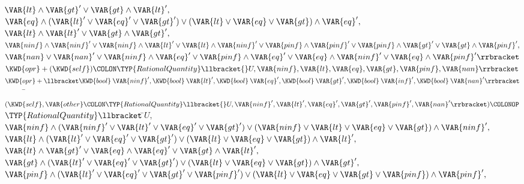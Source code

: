 \begin{Fortress}
\(                         \VAR{lt} \wedge \VAR{gt}' \vee \VAR{gt} \wedge \VAR{lt}',\)\\
\(                         \VAR{eq} \wedge (\VAR{lt}' \vee \VAR{eq}' \vee \VAR{gt}') \vee (\VAR{lt} \vee \VAR{eq} \vee \VAR{gt}) \wedge \VAR{eq}',\)\\
\(                         \VAR{lt} \wedge \VAR{lt}' \vee \VAR{gt} \wedge \VAR{gt}',\)\\
\(                         \VAR{ninf} \wedge \VAR{ninf}' \vee \VAR{ninf} \wedge \VAR{lt}' \vee \VAR{lt} \wedge \VAR{ninf}' \vee \VAR{pinf} \wedge \VAR{pinf}' \vee \VAR{pinf} \wedge \VAR{gt}' \vee \VAR{gt} \wedge \VAR{pinf}',\)\\
\(                         \VAR{nan} \vee \VAR{nan}' \vee \VAR{ninf} \wedge \VAR{eq}' \vee \VAR{pinf} \wedge \VAR{eq}' \vee \VAR{eq} \wedge \VAR{ninf}' \vee \VAR{eq} \wedge \VAR{pinf}'\rrbracket\)\-\-\\\poptabs\poptabs
\(  \KWD{opr} +(\KWD{self})\COLON \TYP{RationalQuantity}\llbracket{}U,\VAR{ninf},\VAR{lt},\VAR{eq},\VAR{gt},\VAR{pinf},\VAR{nan}\rrbracket\)\\
\(  \KWD{opr} +\llbracket\KWD{bool}\:\VAR{ninf}', \KWD{bool}\:\VAR{lt}', \KWD{bool}\:\VAR{eq}', \KWD{bool}\:\VAR{gt}', \KWD{bool}\:\VAR{inf}', \KWD{bool}\:\VAR{nan}'\rrbracket\)\\
{\tt~~~~~}\pushtabs\=\+\(       (\KWD{self}, \VAR{other}\COLON \TYP{RationalQuantity}\llbracket{}U,\VAR{ninf}',\VAR{lt}',\VAR{eq}',\VAR{gt}',\VAR{pinf}',\VAR{nan}'\rrbracket)\COLONOP\)\\
\(       \TYP{RationalQuantity}\llbracket\,\null\)\pushtabs\=\+\(U,\)\\
\(                         \VAR{ninf} \wedge (\VAR{ninf}' \vee \VAR{lt}' \vee \VAR{eq}' \vee \VAR{gt}') \vee (\VAR{ninf} \vee \VAR{lt} \vee \VAR{eq} \vee \VAR{gt}) \wedge \VAR{ninf}',\)\\
\(                         \VAR{lt} \wedge (\VAR{lt}' \vee \VAR{eq}' \vee \VAR{gt}') \vee (\VAR{lt} \vee \VAR{eq} \vee \VAR{gt}) \wedge \VAR{lt}',\)\\
\(                         \VAR{lt} \wedge \VAR{gt}' \vee \VAR{eq} \wedge \VAR{eq}' \vee \VAR{gt} \wedge \VAR{lt}',\)\\
\(                         \VAR{gt} \wedge (\VAR{lt}' \vee \VAR{eq}' \vee \VAR{gt}') \vee (\VAR{lt} \vee \VAR{eq} \vee \VAR{gt}) \wedge \VAR{gt}',\)\\
\(                         \VAR{pinf} \wedge (\VAR{lt}' \vee \VAR{eq}' \vee \VAR{gt}' \vee \VAR{pinf}') \vee (\VAR{lt} \vee \VAR{eq} \vee \VAR{gt} \vee \VAR{pinf}) \wedge \VAR{pinf}',\)\\

\end{Fortress}

